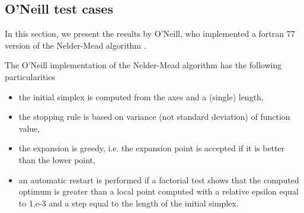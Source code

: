 \subsection{O'Neill test cases}

In this section, we present the results by O'Neill, who 
implemented a fortran 77 version of the Nelder-Mead algorithm
\cite{O'Neill1971AAF}.

The O'Neill implementation of the Nelder-Mead algorithm has the following 
particularities 
\begin{itemize}
\item the initial simplex is computed from the axes and a (single) length,
\item the stopping rule is based on variance (not standard deviation) of function value,
\item the expansion is greedy, i.e. the expansion point is accepted if it is better than the lower point,
\item an automatic restart is performed if a factorial test shows that the 
computed optimum is greater than a local point computed with a relative 
epsilon equal to 1.e-3 and a step equal to the length of the initial simplex.
\end{itemize}

